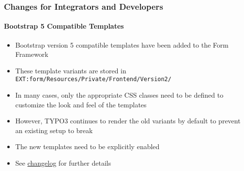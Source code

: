 %

\begin{frame}[fragile]
	\frametitle{Changes for Integrators and Developers}
	\framesubtitle{Bootstrap 5 Compatible Templates}


	\begin{itemize}
		\item Bootstrap version 5 compatible templates have been added to the
			Form Framework
		\item These template variants are stored in\newline
			\small\texttt{EXT:form/Resources/Private/Frontend/Version2/}\normalsize
		\item In many cases, only the appropriate CSS classes need to be defined
			to customize the look and feel of the templates
		\item However, TYPO3 continues to render the old variants by default
			to prevent an existing setup to break
		\item The new templates need to be explicitly enabled
		\item See \href{https://docs.typo3.org/c/typo3/cms-core/master/en-us/Changelog/11.5/Feature-94868-IntroduceBootstrap5CompatibleAndAccessibleTemplates.html}{changelog}
			for further details
	\end{itemize}

\end{frame}

